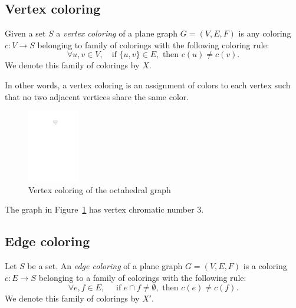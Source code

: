 \subsection{Vertex coloring}

\begin{defn}
    Given a set $S$ a \emph{vertex coloring} of a plane graph $G = (V, E, F)$ is any coloring $c : V \rightarrow S$ belonging to family of colorings with the following coloring rule:
    \begin{equation}\label{eqn:vtx_rule}
        \forall u, v \in V, \quad \text{if } \{u, v\} \in E, \text{ then } c(u) \neq c(v). 
        \tag{$R_V$}
    \end{equation}
    We denote this family of colorings by $X$.
\end{defn}

In other words, a vertex coloring is an assignment of colors to each vertex such that no two adjacent vertices share the same color.

\begin{figure}[H]
    \centering
    \includegraphics[width=0.20\textwidth]{../Resources/Figs/octahedral_vtx_colr.pdf}
    \caption{Vertex coloring of the octahedral graph}
    \label{fig:octahedral_vtx_coloring}
\end{figure}

The graph in Figure~\ref{fig:octahedral_vtx_coloring} has vertex chromatic number 3.

\subsection{Edge coloring}

\begin{defn}
    Let $S$ be a set. An \emph{edge coloring} of a plane graph $G = (V, E, F)$ is a coloring $c : E \rightarrow S$ belonging to a family of colorings with the following rule: 
    \begin{equation}\label{eqn:edge_rule}
     \forall e, f \in E, \quad \text{ if } e \cap f \neq \emptyset, \text{ then } c(e) \neq c(f). \tag{$R_E$}
    \end{equation}
    We denote this family of colorings by $X'$.
   
\end{defn}

